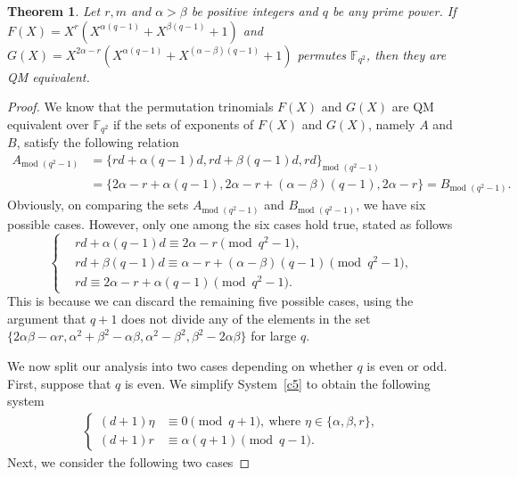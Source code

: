 \documentclass[12pt,reqno]{amsart}
\newtheorem{thm}{Theorem}[section]
\numberwithin{equation}{section}
\theoremstyle{definition}
\newcommand{\F}{\mathbb F}
\begin{document}
\begin{thm}{\label{conjucture}}\cite[Conjecture 1]{Harsh}
Let $r, m$ and $\alpha>\beta$ be positive integers and $q$ be any prime power. If $F(X)=X^r(X^{\alpha(q-1)} + X^{\beta(q-1)} + 1)$ and $G(X)=X^{2\alpha-r}(X^{\alpha(q-1)} + X^{(\alpha-\beta)(q-1)} + 1)$ permutes $\F_{q^2}$, then they are QM equivalent.
\end{thm}
\begin{proof}
We know that the permutation trinomials $F(X)$ and $G(X)$ are QM equivalent over $\F_{q^2}$ if the sets of exponents of $F(X)$ and $G(X)$, namely $A$ and $B$, satisfy the following relation
\begin{align*}
    A_{\text{mod~}(q^2-1)} & = \{rd+\alpha(q-1)d,rd+\beta(q-1)d,rd\}_{\text{mod~}(q^2-1)}\\
    & = \{2\alpha-r+\alpha(q-1),2\alpha-r+(\alpha-\beta)(q-1),2\alpha-r\}=B_{\text{mod~}(q^2-1)}.
\end{align*}
Obviously, on comparing the sets $A_{\text{mod~}(q^2-1)}$ and $B_{\text{mod~}(q^2-1)}$, we have six possible cases. However, only one among the six cases hold true, stated as follows
\begin{equation}\label{c5}
\begin{cases}
& rd+\alpha(q-1)d  \equiv 2\alpha-r \pmod {q^2-1},\\
& rd+\beta(q-1)d  \equiv \alpha-r+(\alpha-\beta)(q-1) \pmod {q^2-1},\\
& rd  \equiv 2\alpha-r+\alpha(q-1) \pmod {q^2-1}.
\end{cases}
\end{equation}	
This is because we can discard the remaining five possible cases, using the argument that $q+1$ does not divide any of the elements in the set $\{2\alpha\beta-\alpha r, \alpha^2+\beta^2-\alpha\beta, \alpha^2-\beta^2, \beta^2-2\alpha\beta \}$ for large $q$.

We now split our analysis into two cases depending on whether $q$ is even or odd. First, suppose that $q$ is even. We simplify System~\eqref{c5} to obtain the following system
\begin{align}\label{c1}
\begin{cases}
(d+1)\eta & \equiv 0 \pmod {q+1}, ~\mbox{where } \eta \in \{\alpha, \beta, r\}, \\
(d+1)r & \equiv \alpha (q+1) \pmod {q-1} .
\end{cases}
\end{align}
Next, we consider the following two cases


\end{proof}
\end{document}
